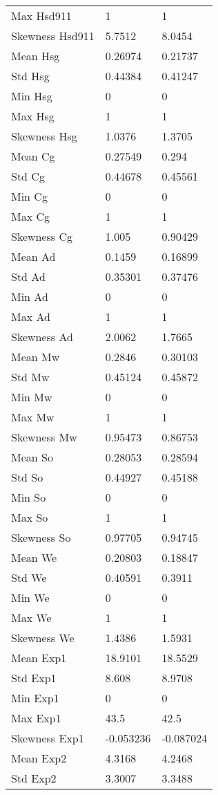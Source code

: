 \begin{tabular}{lll}
Max Hsd911 & 1 & 1 \\ 
Skewness Hsd911 & 5.7512 & 8.0454 \\ 
Mean Hsg & 0.26974 & 0.21737 \\ 
Std Hsg & 0.44384 & 0.41247 \\ 
Min Hsg & 0 & 0 \\ 
Max Hsg & 1 & 1 \\ 
Skewness Hsg & 1.0376 & 1.3705 \\ 
Mean Cg & 0.27549 & 0.294 \\ 
Std Cg & 0.44678 & 0.45561 \\ 
Min Cg & 0 & 0 \\ 
Max Cg & 1 & 1 \\ 
Skewness Cg & 1.005 & 0.90429 \\ 
Mean Ad & 0.1459 & 0.16899 \\ 
Std Ad & 0.35301 & 0.37476 \\ 
Min Ad & 0 & 0 \\ 
Max Ad & 1 & 1 \\ 
Skewness Ad & 2.0062 & 1.7665 \\ 
Mean Mw & 0.2846 & 0.30103 \\ 
Std Mw & 0.45124 & 0.45872 \\ 
Min Mw & 0 & 0 \\ 
Max Mw & 1 & 1 \\ 
Skewness Mw & 0.95473 & 0.86753 \\ 
Mean So & 0.28053 & 0.28594 \\ 
Std So & 0.44927 & 0.45188 \\ 
Min So & 0 & 0 \\ 
Max So & 1 & 1 \\ 
Skewness So & 0.97705 & 0.94745 \\ 
Mean We & 0.20803 & 0.18847 \\ 
Std We & 0.40591 & 0.3911 \\ 
Min We & 0 & 0 \\ 
Max We & 1 & 1 \\ 
Skewness We & 1.4386 & 1.5931 \\ 
Mean Exp1 & 18.9101 & 18.5529 \\ 
Std Exp1 & 8.608 & 8.9708 \\ 
Min Exp1 & 0 & 0 \\ 
Max Exp1 & 43.5 & 42.5 \\ 
Skewness Exp1 & -0.053236 & -0.087024 \\ 
Mean Exp2 & 4.3168 & 4.2468 \\ 
Std Exp2 & 3.3007 & 3.3488 \\ 

\end{tabular}
